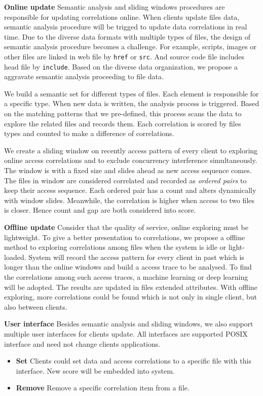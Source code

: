 \textbf{Online update} Semantic analysis and sliding windows procedures are responsible for updating correlations online. When clients update files data, semantic analysis procedure will be trigged to update data correlations in real time. Due to the diverse data formats with multiple types of files, the design of semantic analysis procedure becomes a challenge. For example, scripts, images or other files are linked in web file by \texttt{href} or \texttt{src}. And source code file includes head file by \texttt{include}. Based on the diverse data organization, we propose a aggravate semantic analysis proceeding to file data.

We build a semantic set for different types of files. Each element is responsible for a specific type. When new data is written, the analysis process is triggered. Based on the matching patterns that we pre-defined, this process scans the data to explore the related files and records them. Each correlation is scored by files types and counted to make a difference of correlations.

We create a sliding window on recently access pattern of every client to exploring online access correlations and to exclude concurrency interference simultaneously. The window is with a fixed size and slides ahead as new access sequence comes. The files in window are considered correlated and recorded as \emph{ordered pairs} to keep their access sequence. Each ordered pair has a count and alters dynamically with window slides. Meanwhile, the correlation is higher when access to two files is closer. Hence count and gap are both considered into score.

\textbf{Offline update} Consider that the quality of service, online exploring must be lightweight. To give a better presentation to correlations, we propose a offline method to exploring correlations among files when the system is idle or light-loaded. System will record the access pattern for every client in past which is longer than the online windows and build a access trace to be analysed. To find the correlations among such access traces, a machine learning or deep learning will be adopted. The results are updated in files extended attributes. With offline exploring, more correlations could be found which is not only in single client, but also between clients.

\textbf{User interface} Besides semantic analysis and sliding windows, we also support multiple user interfaces for clients update. All interfaces are supported POSIX interface and need not change clients applications.
\begin{itemize}
  \item \textbf{Set} Clients could set data and access correlations to a specific file with this interface. New score will be embedded into system.
  \item \textbf{Remove} Remove a specific correlation item from a file.
\end{itemize}

